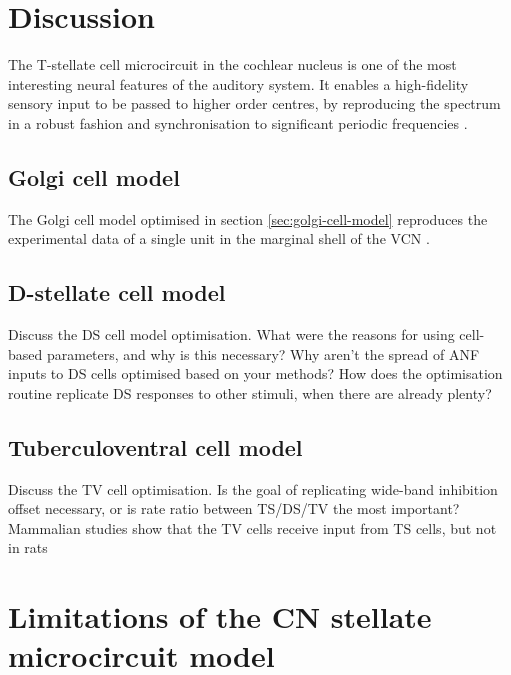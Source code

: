 \section{Discussion}

The T-stellate cell microcircuit in the
cochlear nucleus is one of the most interesting neural features of the
auditory system.  It enables a high-fidelity sensory input to be
passed to higher order centres, by reproducing the spectrum in a
robust fashion \citep{BlackburnSachs:1990,May:2003} and
synchronisation to significant periodic frequencies
\citep{KeilsonRichardsEtAl:1997}.

\medskip{} 

\subsection{Golgi cell model}
  The Golgi cell model optimised in section
\ref{sec:golgi-cell-model} reproduces the experimental data of a
single unit in the marginal shell of the VCN \citep{GhoshalKim:1997}.

\medskip{}
\subsection{D-stellate cell model}
Discuss the DS cell model optimisation.  What were the reasons for
using cell-based parameters, and why is this necessary?  Why aren't
the spread of ANF inputs to DS cells optimised based on your methods?
How does the optimisation routine replicate DS responses to other
stimuli, when there are already plenty?

\medskip{}
\subsection{Tuberculoventral cell model}
Discuss the TV cell optimisation. Is the goal of replicating wide-band
inhibition offset necessary, or is rate ratio between TS/DS/TV the
most important?  Mammalian studies show that the TV cells receive
input from TS cells, but not in rats


\section{Limitations of the CN stellate microcircuit model}

